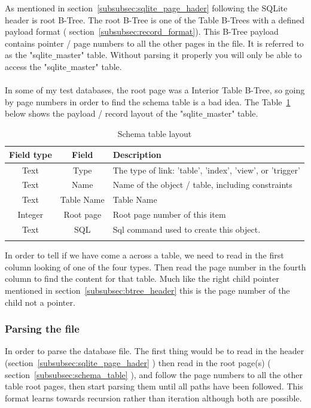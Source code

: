 As mentioned in section~\ref{subsubsec:sqlite_page_hader} following the SQLite header is root B-Tree. The root B-Tree is one of the Table B-Trees with a defined payload format ( section~\ref{subsubsec:record_format}). This B-Tree payload contains pointer / page numbers to all the other pages in the file. It is referred to as the "sqlite\verb|_|master" table. Without parsing it properly you will only be able to access the "sqlite\verb|_|master" table.
\\\\
In some of my test databases, the root page was a Interior Table B-Tree, so going by page numbers in order to find the schema table is a bad idea. The Table~\ref{tbl:schema_table} below shows the payload / record layout of the "sqlite\verb|_|master" table.

\begin{longtable}[h]{| c | c| p{10cm} |}
		\hline
			\textbf{Field type} & \textbf{Field} & \textbf{Description} \\ 
		\hline
		\endhead
			Text & Type & The type of link: 'table', 'index', 'view', or 'trigger' \\
		\hline
			Text & Name & Name of the object / table, including constraints \\
		\hline
			Text & Table Name & Table Name \\
		\hline
			Integer & Root page & Root page number of this item \\
		\hline
			Text & SQL & Sql command used to create this object. \\
		\hline
	\caption{Schema table layout}
	\label{tbl:schema_table}
\end{longtable}

In order to tell if we have come a across a table, we need to read in the first column looking of one of the four types. Then read the page number in the fourth column to find the content for that table. Much like the right child pointer mentioned in section~\ref{subsubsec:btree_header} this is the page number of the child not a pointer.

\subsubsection{Parsing the file}
\label{subsubsec:parsing the file}

In order to parse the database file. The first thing would be to read in the header (section~\ref{subsubsec:sqlite_page_hader} ) then read in the root page(s) ( section~\ref{subsubsec:schema_table} ), and follow the page numbers to all the other table root pages, then start parsing them until all paths have been followed. This format learns towards recursion rather than iteration although both are possible.
